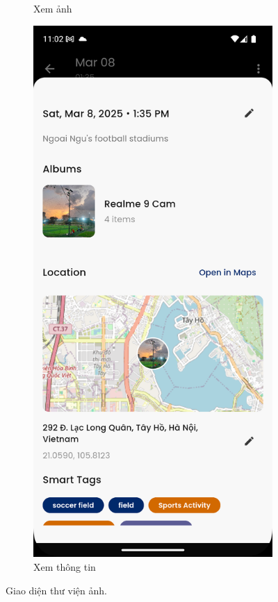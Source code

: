 \begin{figure}[H]
\begin{subfigure}{0.48\textwidth}
        \caption{Xem ảnh}
    \end{subfigure}
    \hfill
    \begin{subfigure}{0.48\textwidth}
        \includegraphics[width=1\linewidth]{figures/c4/4-2/image_info.png} 
        \caption{Xem thông tin }
    \end{subfigure}
    \caption{Giao diện thư viện ảnh.}
    \label{fig:photo-info}
\end{figure}